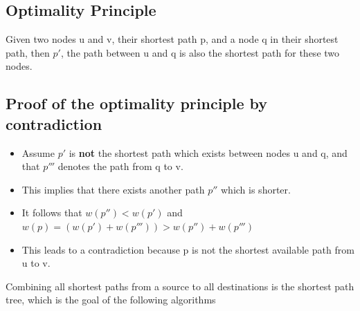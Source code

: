 \documentclass[12pt,letterpaper]{article}
\begin{document}
\subsection{Optimality Principle}
Given two nodes u and v, their shortest path p, and a node q in their shortest path, then $p'$, the path between u and q is also the shortest path for these two nodes. 
\subsection{Proof of the optimality principle by contradiction}
\begin{itemize}
\item Assume $p'$ is \textbf{not} the shortest path which exists between nodes u and q, and that $p'''$ denotes the path from q to v.
\item This implies that there exists another path $p''$ which is shorter. 
\item It follows that $w(p'')<w(p')$ and $w(p)=(w(p')+w(p'''))>w(p'')+w(p''')$
\item This leads to a contradiction because p is not the shortest available path from u to v.
\end{itemize}
Combining all shortest paths from a source to all destinations is the shortest path tree, which is the goal of the following algorithms
\end{document}
